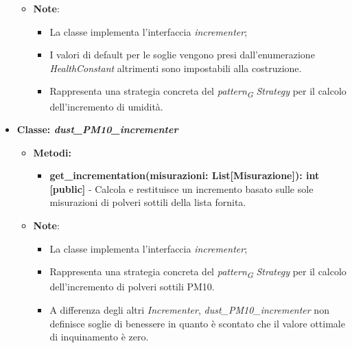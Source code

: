 \begin{itemize}
\begin{itemize}
\begin{itemize}
    \end{itemize}
    \item\textbf{Note}:
        \begin{itemize}
            \item La classe implementa l'interfaccia \textit{incrementer};
            \item I valori di default per le soglie vengono presi dall'enumerazione \textit{HealthConstant} altrimenti sono impostabili alla costruzione.
            \item Rappresenta una strategia concreta del \textit{pattern}\textsubscript{\textit{G}} \textit{Strategy} per il calcolo dell'incremento di umidità.
        \end{itemize}
    \end{itemize}\item{\textbf{Classe: \textit{dust\_PM10\_incrementer}}}
    \begin{itemize}
    \item \textbf{Metodi: } 
    \begin{itemize}
        \item \textbf{get\_incrementation(misurazioni: List[Misurazione]): int [public]} - Calcola e restituisce un incremento basato sulle sole misurazioni di polveri sottili della lista fornita.
    \end{itemize}
    \item\textbf{Note}:
        \begin{itemize}
            \item La classe implementa l'interfaccia \textit{incrementer};
            \item Rappresenta una strategia concreta del \textit{pattern}\textsubscript{\textit{G}} \textit{Strategy} per il calcolo dell'incremento di polveri sottili PM10.
            \item A differenza degli altri \textit{Incrementer}, \textit{dust\_PM10\_incrementer} non definisce soglie di benessere in quanto è scontato che il valore ottimale di inquinamento è zero.
        \end{itemize}
    \end{itemize}

\end{itemize}

